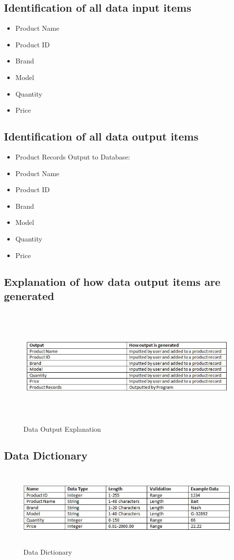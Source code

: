 \subsection{Identification of all data input items}
\begin{itemize}
	\item Product Name
	\item Product ID
	\item Brand
	\item Model
	\item Quantity
	\item Price
\end{itemize}
\subsection{Identification of all data output items}
\begin{itemize}
	\item Product Records
Output to Database:
	\item Product Name
	\item Product ID
	\item Brand
	\item Model
	\item Quantity
	\item Price
\end{itemize}
\subsection{Explanation of how data output items are generated}
\begin{figure}[H]
	\centering
	\includegraphics[width= 15cm, height = 6cm]{Design/images/data_outputs.JPG}
	\caption {Data Output Explanation} \label{fig:data_output_explaination}
\end{figure}
\subsection{Data Dictionary}
\begin{figure}[H]
	\centering
	\includegraphics[width= 15cm, height = 4cm]{Analysis/images/data_dictionary.JPG}
	\caption {Data Dictionary} \label{fig:data_dictionary}
\end{figure}
